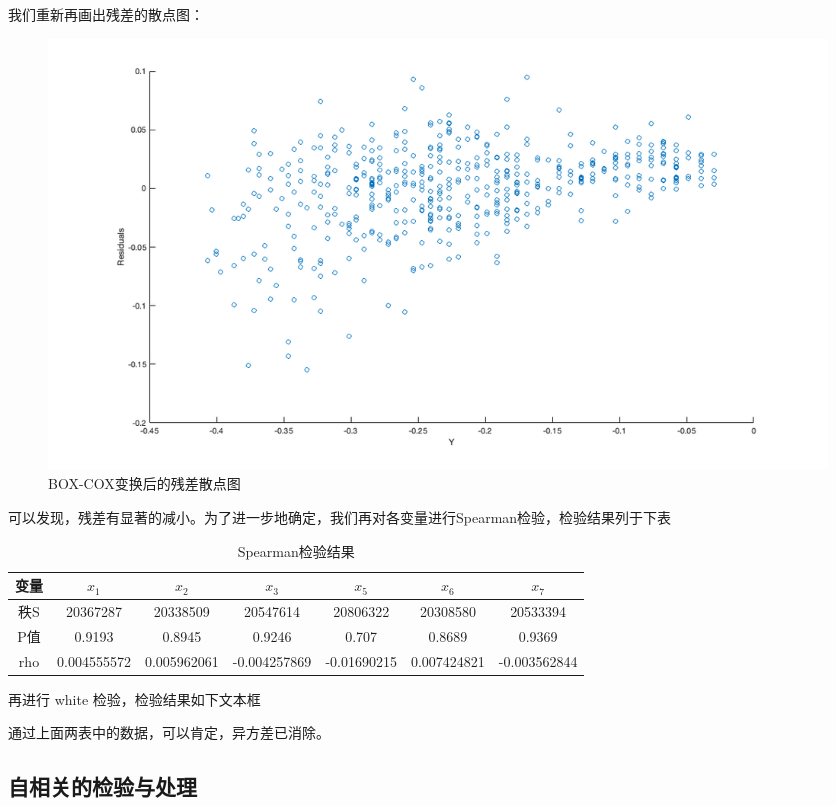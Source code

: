 \documentclass[11pt]{article}
\begin{document}
我们重新再画出残差的散点图：

\begin{figure}[H]
	\centering
	\caption{BOX-COX变换后的残差散点图}
	\includegraphics[scale=0.35]{images/box_cox_residuals.png}
\end{figure}

可以发现，残差有显著的减小。为了进一步地确定，我们再对各变量进行Spearman检验，检验结果列于下表
\begin{table}[H]
	\centering
	\caption{Spearman检验结果}
	\begin{tabular}{ccccccc}
		\hline
		变量& $x_1$    & $x_2$    & $x_3$   &   $x_5$    & $x_6$    & $x_7$\\
		\hline
		秩S&20367287&20338509&20547614&20806322&20308580&20533394\\
		P值&0.9193&0.8945&0.9246&0.707&0.8689&0.9369\\
		rho&0.004555572&0.005962061&-0.004257869&-0.01690215 &0.007424821&-0.003562844\\
		\hline
	\end{tabular}
\end{table}
再进行 white 检验，检验结果如下文本框
\begin{center}
\end{center}
通过上面两表中的数据，可以肯定，异方差已消除。
\subsection{自相关的检验与处理}
\end{document}
